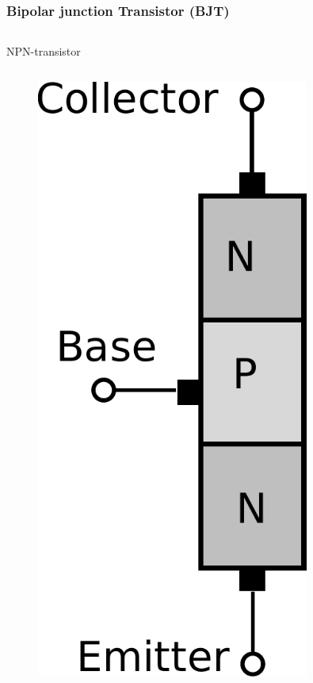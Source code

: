 \documentclass[beamer]{standalone}
\begin{document}
\begin{frame}
\frametitle{Bipolar junction Transistor (BJT)}
\begin{columns}[t]
	\begin{column}{.5\textwidth}
		NPN-transistor
		\begin{columns}[t]
			\begin{column}{.40\textwidth}
				\begin{figure}
					\includegraphics[width=0.80\textwidth]{./pics/npn_transistor.pdf}
				\end{figure}

\end{column}
\end{columns}
\end{column}
\end{columns}
\end{frame}
\end{document}
